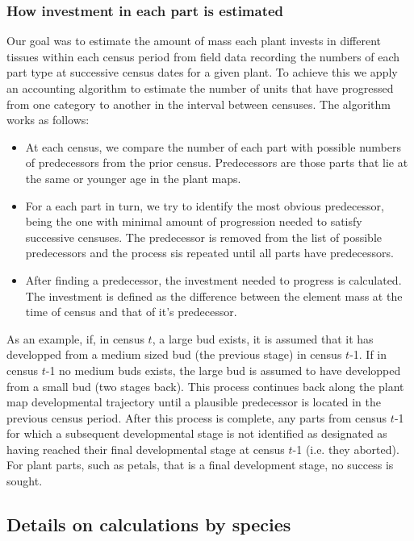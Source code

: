 \documentclass[10pt,twoside]{article}\usepackage[]{graphicx}\usepackage[]{color}
\begin{document}
\subsubsection{How investment in each part is estimated}


Our goal was to estimate the amount of mass each plant invests in different tissues within each census period from field data recording the numbers of each part type at successive census dates for a given plant. To achieve this we apply an accounting algorithm to estimate the number of units that have progressed from one category to another in the interval between censuses. The algorithm works as follows:

\begin{itemize}
\item At each census, we compare the number of each part with possible numbers of predecessors from the prior census. Predecessors are those parts that lie at the same or younger age in the plant maps.
\item For a each part in turn, we try to identify the most obvious predecessor, being the one with minimal amount of progression needed to satisfy successive censuses. The predecessor is removed from the list of possible predecessors and the process sis repeated until all parts have predecessors.
\item After finding a predecessor, the investment needed to progress  is calculated. The investment is defined as the difference between the element mass at the time of census and that of it's predecessor.
\end{itemize}

As an example, if, in census $t$, a large bud exists, it is assumed that it has developped from a medium sized bud (the previous stage) in census $t$-1. If in census $t$-1 no medium buds exists, the large bud is assumed to have developped from a small bud (two stages back). This process continues back along the plant map developmental trajectory until a plausible predecessor is located in the previous census period. After this process is complete, any parts from census $t$-1 for which a subsequent developmental stage is not identified as designated as having reached their final developmental stage at census $t$-1 (i.e. they aborted). For plant parts, such as petals, that is a final development stage, no success is sought.


\subsection{Details on calculations by species}
\end{document}
